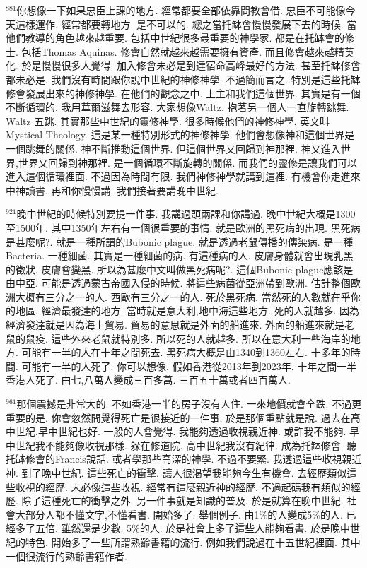 \documentclass{book}
\begin{document}
$^{881}$你想像一下如果忠臣上課的地方.
經常都要全部依靠問教會借.
忠臣不可能像今天這樣運作.
經常都要轉地方.
是不可以的.
總之當托缽會慢慢發展下去的時候.
當他們教導的角色越來越重要.
包括中世紀很多最重要的神學家.
都是在托缽會的修士.
包括Thomas Aquinas.
修會自然就越來越需要擁有資產.
而且修會越來越精英化.
於是慢慢很多人覺得.
加入修會未必是到達宿命高峰最好的方法.
甚至托缽修會都未必是.
我們沒有時間跟你說中世紀的神修神學.
不過簡而言之.
特別是這些托缽修會發展出來的神修神學.
在他們的觀念之中.
上主和我們這個世界.
其實是有一個不斷循環的.
我用華爾滋舞去形容.
大家想像Waltz.
抱著另一個人一直旋轉跳舞.
Waltz 五跳.
其實那些中世紀的靈修神學.
很多時候他們的神修神學.
英文叫Mystical Theology.
這是某一種特別形式的神修神學.
他們會想像神和這個世界是一個跳舞的關係.
神不斷推動這個世界.
但這個世界又回歸到神那裡.
神又進入世界,世界又回歸到神那裡.
是一個循環不斷旋轉的關係.
而我們的靈修是讓我們可以進入這個循環裡面.
不過因為時間有限.
我們神修神學就講到這裡.
有機會你走進來中神讀書.
再和你慢慢講.
我們接著要講晚中世紀.

$^{921}$晚中世紀的時候特別要提一件事.
我講過頭兩課和你講過.
晚中世紀大概是1300至1500年.
其中1350年左右有一個很重要的事情.
就是歐洲的黑死病的出現.
黑死病是甚麼呢?.
就是一種所謂的Bubonic plague.
就是透過老鼠傳播的傳染病.
是一種Bacteria.
一種細菌.
其實是一種細菌的病.
有這種病的人.
皮膚身體就會出現乳黑的徵狀.
皮膚會變黑.
所以為甚麼中文叫做黑死病呢?.
這個Bubonic plague應該是由中亞.
可能是透過蒙古帝國入侵的時候.
將這些病菌從亞洲帶到歐洲.
估計整個歐洲大概有三分之一的人.
西歐有三分之一的人.
死於黑死病.
當然死的人數就在乎你的地區.
經濟最發達的地方.
當時就是意大利,地中海這些地方.
死的人就越多.
因為經濟發達就是因為海上貿易.
貿易的意思就是外面的船進來.
外面的船進來就是老鼠的鼠疫.
這些外來老鼠就特別多.
所以死的人就越多.
所以在意大利一些海岸的地方.
可能有一半的人在十年之間死去.
黑死病大概是由1340到1360左右.
十多年的時間.
可能有一半的人死了.
你可以想像.
假如香港從2013年到2023年.
十年之間一半香港人死了.
由七,八萬人變成三百多萬.
三百五十萬或者四百萬人.

$^{961}$那個震撼是非常大的.
不如香港一半的房子沒有人住.
一來地價就會全跌.
不過更重要的是.
你會忽然間覺得死亡是很接近的一件事.
於是那個重點就是說.
過去在高中世紀,早中世紀也好.
一般的人會覺得.
我能夠透過收視親近神.
或許我不能夠.
早中世紀我不能夠像收視那樣.
躲在修道院.
高中世紀我沒有紀律.
成為托缽修會.
聽托缽修會的Francis說話.
或者學那些高深的神學.
不過不要緊.
我透過這些收視親近神.
到了晚中世紀.
這些死亡的衝擊.
讓人很渴望我能夠今生有機會.
去經歷類似這些收視的經歷.
未必像這些收視.
經常有這麼親近神的經歷.
不過起碼我有類似的經歷.
除了這種死亡的衝擊之外.
另一件事就是知識的普及.
於是就算在晚中世紀.
社會大部分人都不懂文字,不懂看書.
開始多了.
舉個例子.
由1\%的人變成5\%的人.
已經多了五倍.
雖然還是少數.
5\%的人.
於是社會上多了這些人能夠看書.
於是晚中世紀的特色.
開始多了一些所謂熟齡書籍的流行.
例如我們說過在十五世紀裡面.
其中一個很流行的熟齡書籍作者.
\end{document}
